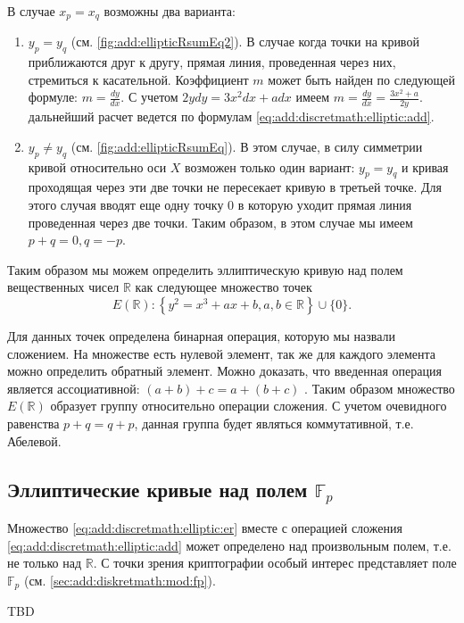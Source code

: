 В случае $x_p = x_q$ возможны два варианта:
\begin{enumerate}
\item $y_p = y_q$ (см. \autoref{fig:add:ellipticRsumEq2}). В случае
  когда точки на кривой приближаются друг к другу, прямая линия,
  проведенная через них, стремиться к касательной. Коэффициент $m$
  может быть найден по следующей формуле: $m = \frac{dy}{dx}$. С
  учетом $2ydy = 3x^2 dx + a dx$ имеем $m = \frac{dy}{dx} = \frac{3
    x^2 + a}{2y}$. дальнейший расчет ведется по формулам
  \eqref{eq:add:discretmath:elliptic:add}. 
\item $y_p \ne y_q$ (см. \autoref{fig:add:ellipticRsumEq}). В этом
  случае, в силу симметрии кривой относительно оси $X$ возможен только
  один вариант: $y_p = y_q$ и кривая проходящая через эти две точки не
  пересекает кривую в третьей точке. Для этого случая вводят еще одну
  точку $0$ в которую уходит прямая линия проведенная через две точки.
  Таким образом, в этом случае мы имеем $p + q = 0, q = -p$.
\end{enumerate}

Таким образом мы можем определить эллиптическую кривую над полем
вещественных чисел $\mathbb{R}$ как следующее множество точек
\begin{equation}
E\left(\mathbb{R}\right) : \left\{
y^2 = x^3 +ax +b, a,b \in \mathbb{R}
\right\} \cup \{0\}.
\label{eq:add:discretmath:elliptic:er}
\end{equation}

Для данных точек определена бинарная операция, которую мы назвали
сложением. На множестве есть нулевой элемент, так же для каждого
элемента можно определить обратный элемент. Можно доказать, что
введенная операция является ассоциативной: $(a+b) + c = a + (b+c)$
\cite{Washington:2008:ECN:1388394}. Таким образом множество
$E\left(\mathbb{R}\right)$ образует группу относительно операции
сложения. С учетом очевидного равенства $p + q = q + p$, данная группа
будет являться коммутативной, т.е. Абелевой. 


\subsection{Эллиптические кривые над полем $\mathbb{F}_p$}
Множество \eqref{eq:add:discretmath:elliptic:er} вместе с операцией
сложения \eqref{eq:add:discretmath:elliptic:add} может определено над
произвольным полем, т.е. не только над $\mathbb{R}$. С точки зрения
криптографии особый интерес представляет поле $\mathbb{F}_p$ (см.
\autoref{sec:add:diskretmath:mod:fp}).

TBD
